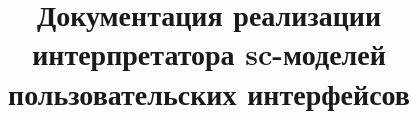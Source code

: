 \documentclass{scndocument}
\begin{document}
\DeactivateBG
\title{\centering
Документация реализации интерпретатора sc-моделей пользовательских интерфейсов}
\author{}
\maketitle

\normalsize

\setcounter{page}{3}

\ActivateBG
\begin{SCn}

\end{SCn}
\end{document}
